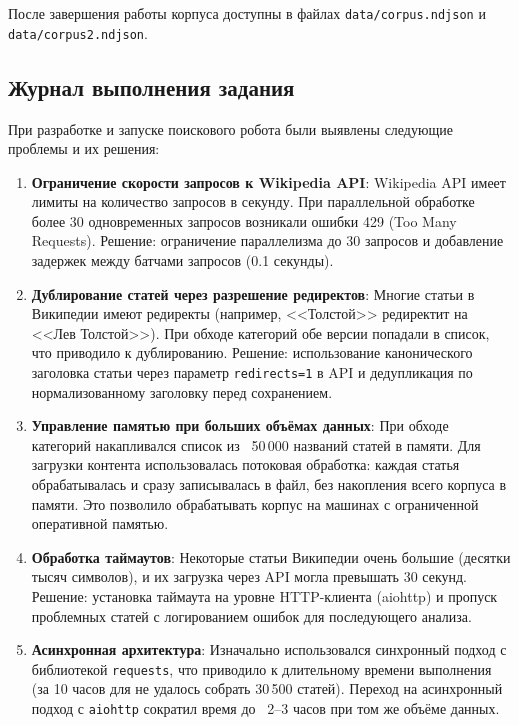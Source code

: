 После завершения работы корпуса доступны в файлах \texttt{data/corpus.ndjson} и \texttt{data/corpus2.ndjson}.

\subsection{Журнал выполнения задания}

При разработке и запуске поискового робота были выявлены следующие проблемы и их решения:

\begin{enumerate}
    \item \textbf{Ограничение скорости запросов к Wikipedia API}: Wikipedia API имеет лимиты на количество запросов в секунду. При параллельной обработке более 30 одновременных запросов возникали ошибки 429 (Too Many Requests). Решение: ограничение параллелизма до 30 запросов и добавление задержек между батчами запросов (0.1 секунды).
    
    \item \textbf{Дублирование статей через разрешение редиректов}: Многие статьи в Википедии имеют редиректы (например, <<Толстой>> редиректит на <<Лев Толстой>>). При обходе категорий обе версии попадали в список, что приводило к дублированию. Решение: использование канонического заголовка статьи через параметр \texttt{redirects=1} в API и дедупликация по нормализованному заголовку перед сохранением.
    
    \item \textbf{Управление памятью при больших объёмах данных}: При обходе категорий накапливался список из ~50\,000 названий статей в памяти. Для загрузки контента использовалась потоковая обработка: каждая статья обрабатывалась и сразу записывалась в файл, без накопления всего корпуса в памяти. Это позволило обрабатывать корпус на машинах с ограниченной оперативной памятью.
    
    \item \textbf{Обработка таймаутов}: Некоторые статьи Википедии очень большие (десятки тысяч символов), и их загрузка через API могла превышать 30 секунд. Решение: установка таймаута на уровне HTTP-клиента (aiohttp) и пропуск проблемных статей с логированием ошибок для последующего анализа.
    
    \item \textbf{Асинхронная архитектура}: Изначально использовался синхронный подход с библиотекой \texttt{requests}, что приводило к длительному времени выполнения (за 10 часов для не удалось собрать 30\,500 статей). Переход на асинхронный подход с \texttt{aiohttp} сократил время до ~2--3 часов при том же объёме данных.
\end{enumerate}

